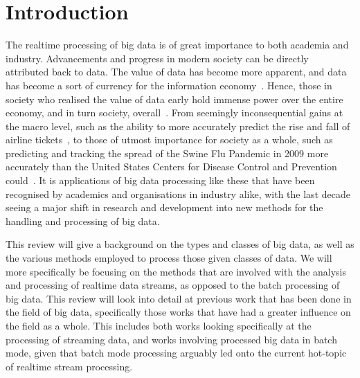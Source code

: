 
\section{Introduction} %
\label{sec:litrev_introduction}

The realtime processing of big data is of great importance to both academia and industry. Advancements and progress in
modern society can be directly attributed back to data. The value of data has become more apparent, and data has become
a sort of currency for the information economy~\cite{st2009examining}. Hence, those in society who realised the value of
data early hold immense power over the entire economy, and in turn society, overall~\cite{lievesley1993increasing}.
From seemingly inconsequential gains at the macro level, such as the ability to more
accurately predict the rise and fall of airline tickets~\cite{darlin2006airfares}, to those of utmost importance for
society as a whole, such as predicting and tracking the spread of the Swine Flu Pandemic in 2009 more accurately than
the United States Centers for Disease Control and Prevention could~\cite{ritterman2009using,mayer2013big}. It is
applications of big data processing like these that have been recognised by academics and organisations in
industry alike, with the last decade seeing a major shift in research and development into new methods for the handling
and processing of big data.

This review will give a background on the types and classes of big data, as well as the various methods employed to
process those given classes of data. We will more specifically be focusing on the methods that are involved with the
analysis and processing of realtime data streams, as opposed to the batch processing of big data. This review will look
into detail at previous work that has been done in the field of big data, specifically those works that have had a
greater influence on the field  as a whole. This includes both works looking specifically at the processing of streaming
data, and works involving processed big data in batch mode, given that batch mode processing arguably led onto the
current hot-topic of realtime stream processing.

